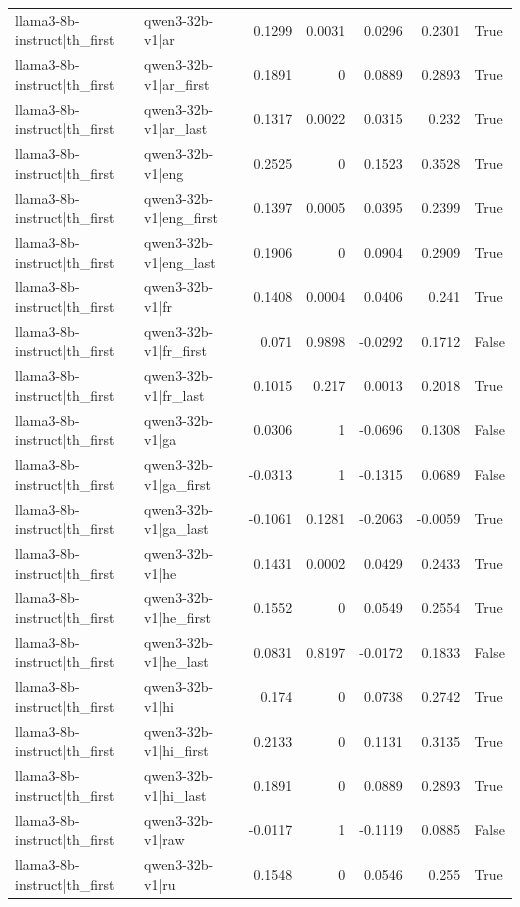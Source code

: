 \begin{table}
\begin{tabular}{l l r r r r l}
llama3-8b-instruct|th_first & qwen3-32b-v1|ar & 0.1299 & 0.0031 & 0.0296 & 0.2301 & True \\
llama3-8b-instruct|th_first & qwen3-32b-v1|ar_first & 0.1891 & 0 & 0.0889 & 0.2893 & True \\
llama3-8b-instruct|th_first & qwen3-32b-v1|ar_last & 0.1317 & 0.0022 & 0.0315 & 0.232 & True \\
llama3-8b-instruct|th_first & qwen3-32b-v1|eng & 0.2525 & 0 & 0.1523 & 0.3528 & True \\
llama3-8b-instruct|th_first & qwen3-32b-v1|eng_first & 0.1397 & 0.0005 & 0.0395 & 0.2399 & True \\
llama3-8b-instruct|th_first & qwen3-32b-v1|eng_last & 0.1906 & 0 & 0.0904 & 0.2909 & True \\
llama3-8b-instruct|th_first & qwen3-32b-v1|fr & 0.1408 & 0.0004 & 0.0406 & 0.241 & True \\
llama3-8b-instruct|th_first & qwen3-32b-v1|fr_first & 0.071 & 0.9898 & -0.0292 & 0.1712 & False \\
llama3-8b-instruct|th_first & qwen3-32b-v1|fr_last & 0.1015 & 0.217 & 0.0013 & 0.2018 & True \\
llama3-8b-instruct|th_first & qwen3-32b-v1|ga & 0.0306 & 1 & -0.0696 & 0.1308 & False \\
llama3-8b-instruct|th_first & qwen3-32b-v1|ga_first & -0.0313 & 1 & -0.1315 & 0.0689 & False \\
llama3-8b-instruct|th_first & qwen3-32b-v1|ga_last & -0.1061 & 0.1281 & -0.2063 & -0.0059 & True \\
llama3-8b-instruct|th_first & qwen3-32b-v1|he & 0.1431 & 0.0002 & 0.0429 & 0.2433 & True \\
llama3-8b-instruct|th_first & qwen3-32b-v1|he_first & 0.1552 & 0 & 0.0549 & 0.2554 & True \\
llama3-8b-instruct|th_first & qwen3-32b-v1|he_last & 0.0831 & 0.8197 & -0.0172 & 0.1833 & False \\
llama3-8b-instruct|th_first & qwen3-32b-v1|hi & 0.174 & 0 & 0.0738 & 0.2742 & True \\
llama3-8b-instruct|th_first & qwen3-32b-v1|hi_first & 0.2133 & 0 & 0.1131 & 0.3135 & True \\
llama3-8b-instruct|th_first & qwen3-32b-v1|hi_last & 0.1891 & 0 & 0.0889 & 0.2893 & True \\
llama3-8b-instruct|th_first & qwen3-32b-v1|raw & -0.0117 & 1 & -0.1119 & 0.0885 & False \\
llama3-8b-instruct|th_first & qwen3-32b-v1|ru & 0.1548 & 0 & 0.0546 & 0.255 & True \\

\end{tabular}
\end{table}
